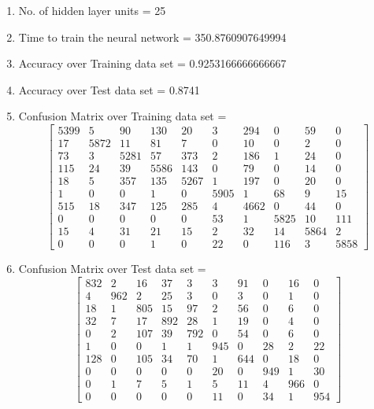 \documentclass[11pt]{article}
\begin{document}
\hline
\begin{enumerate}
\item No. of hidden layer units = 25
\item Time to train the neural network = 350.8760907649994
\item Accuracy over Training data set = 0.9253166666666667
\item Accuracy over Test data set = 0.8741
\item Confusion Matrix over Training data set = 
\begin{equation}
  \begin{bmatrix}
5399 & 5 & 90 & 130 & 20 & 3 & 294 & 0 & 59 & 0\\
17 & 5872 & 11 & 81 & 7 & 0 & 10 & 0 & 2 & 0\\
73 & 3 & 5281 & 57 & 373 & 2 & 186 & 1 & 24 & 0\\
115 & 24 & 39 & 5586 & 143 & 0 & 79 & 0 & 14 & 0\\
18 & 5 & 357 & 135 & 5267 & 1 & 197 & 0 & 20 & 0\\
1 & 0 & 0 & 1 & 0 & 5905 & 1 & 68 & 9 & 15\\
515 & 18 & 347 & 125 & 285 & 4 & 4662 & 0 & 44 & 0\\
0 & 0 & 0 & 0 & 0 & 53 & 1 & 5825 & 10 & 111\\
15 & 4 & 31 & 21 & 15 & 2 & 32 & 14 & 5864 & 2\\
0 & 0 & 0 & 1 & 0 & 22 & 0 & 116 & 3 & 5858
  \end{bmatrix}
\end{equation}
\item Confusion Matrix over Test data set = 
\begin{equation}
  \begin{bmatrix}
832 & 2 & 16 & 37 & 3 & 3 & 91 & 0 & 16 & 0\\
4 & 962 & 2 & 25 & 3 & 0 & 3 & 0 & 1 & 0\\
18 & 1 & 805 & 15 & 97 & 2 & 56 & 0 & 6 & 0\\
32 & 7 & 17 & 892 & 28 & 1 & 19 & 0 & 4 & 0\\
0 & 2 & 107 & 39 & 792 & 0 & 54 & 0 & 6 & 0\\
1 & 0 & 0 & 1 & 1 & 945 & 0 & 28 & 2 & 22\\
128 & 0 & 105 & 34 & 70 & 1 & 644 & 0 & 18 & 0\\
0 & 0 & 0 & 0 & 0 & 20 & 0 & 949 & 1 & 30\\
0 & 1 & 7 & 5 & 1 & 5 & 11 & 4 & 966 & 0\\
0 & 0 & 0 & 0 & 0 & 11 & 0 & 34 & 1 & 954
  \end{bmatrix}
\end{equation}
\end{enumerate}
\end{document}
